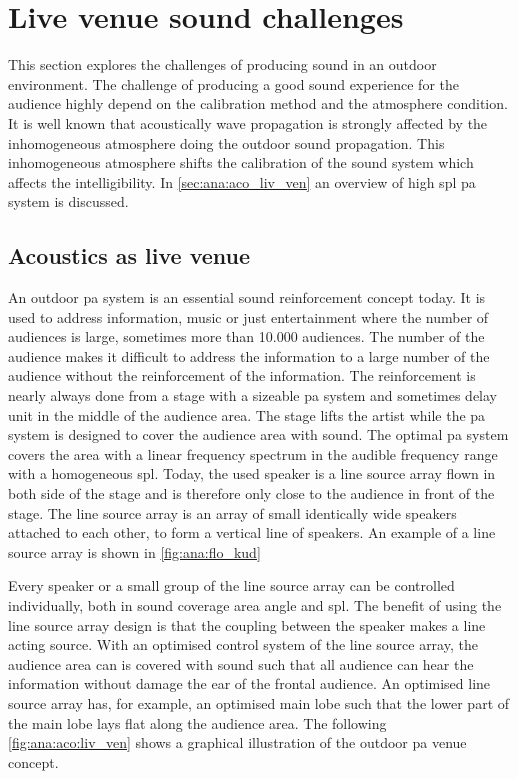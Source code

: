 \section{Live venue sound challenges}
This section explores the challenges of producing sound in an outdoor environment. The challenge of producing a good sound experience for the audience highly depend on the calibration method and the atmosphere condition. It is well known that acoustically wave propagation is strongly affected by the inhomogeneous atmosphere doing the outdoor sound propagation. This inhomogeneous atmosphere shifts the calibration of the sound system which affects the intelligibility. In \autoref{sec:ana:aco_liv_ven} an overview of high \gls{spl} \gls{pa} system is discussed.



\subsection{Acoustics as live venue}\label{sec:ana:aco_liv_ven}
An outdoor \gls{pa} system is an essential sound reinforcement concept today. It is used to address information, music or just entertainment where the number of audiences is large, sometimes more than 10.000 audiences. The number of the audience makes it difficult to address the information to a large number of the audience without the reinforcement of the information. The reinforcement is nearly always done from a stage with a sizeable \gls{pa} system and sometimes delay unit in the middle of the audience area. The stage lifts the artist while the \gls{pa} system is designed to cover the audience area with sound. The optimal \gls{pa} system covers the area with a linear frequency spectrum in the audible frequency range with a homogeneous \gls{spl}. Today, the used speaker is a line source array flown in both side of the stage and is therefore only close to the audience in front of the stage. The line source array is an array of small identically wide speakers attached to each other, to form a vertical line of speakers. An example of a line source array is shown in \autoref{fig:ana:flo_kud}


Every speaker or a small group of the line source array can be controlled individually, both in sound coverage area angle and \gls{spl}. The benefit of using the line source array design is that the coupling between the speaker makes a line acting source. With an optimised control system of the line source array, the audience area can is covered with sound such that all audience can hear the information without damage the ear of the frontal audience. An optimised line source array has, for example, an optimised main lobe such that the lower part of the main lobe lays flat along the audience area.
The following \autoref{fig:ana:aco:liv_ven} shows a graphical illustration of the outdoor \gls{pa} venue concept.

